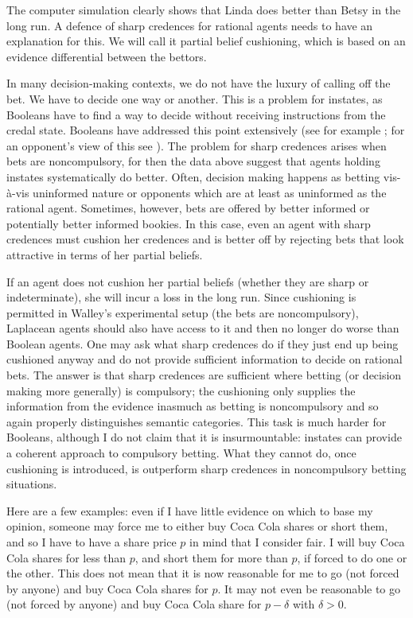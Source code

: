 \documentclass[11pt]{article}
\begin{document}
The computer simulation clearly shows that Linda does better than
Betsy in the long run. A defence of sharp credences for rational
agents needs to have an explanation for this. We will call it partial
belief cushioning, which is based on an evidence differential between
the bettors.

In many decision-making contexts, we do not have the luxury of calling
off the bet. We have to decide one way or another. This is a problem
for instates, as Booleans have to find a way to decide without
receiving instructions from the credal state. Booleans have addressed
this point extensively (see for example ; for
an opponent's view of this see ). The problem
for sharp credences arises when bets are noncompulsory, for then the
data above suggest that agents holding instates systematically do
better. Often, decision making happens as betting vis-{\`a}-vis
uninformed nature or opponents which are at least as uninformed as the
rational agent. Sometimes, however, bets are offered by better
informed or potentially better informed bookies. In this case, even an
agent with sharp credences must cushion her credences and is better
off by rejecting bets that look attractive in terms of her partial
beliefs.

If an agent does not cushion her partial beliefs (whether they are
sharp or indeterminate), she will incur a loss in the long run. Since
cushioning is permitted in Walley's experimental setup (the bets are
noncompulsory), Laplacean agents should also have access to it and
then no longer do worse than Boolean agents. One may ask what sharp
credences do if they just end up being cushioned anyway and do not
provide sufficient information to decide on rational bets. The answer
is that sharp credences are sufficient where betting (or decision
making more generally) is compulsory; the cushioning only supplies the
information from the evidence inasmuch as betting is noncompulsory and
so again properly distinguishes semantic categories. This task is much
harder for Booleans, although I do not claim that it is
insurmountable: instates can provide a coherent approach to compulsory
betting. What they cannot do, once cushioning is introduced, is
outperform sharp credences in noncompulsory betting situations.

Here are a few examples: even if I have little evidence on which to
base my opinion, someone may force me to either buy Coca Cola shares
or short them, and so I have to have a share price $p$ in mind that I
consider fair. I will buy Coca Cola shares for less than $p$, and
short them for more than $p$, if forced to do one or the other. This
does not mean that it is now reasonable for me to go (not forced by
anyone) and buy Coca Cola shares for $p$. It may not even be
reasonable to go (not forced by anyone) and buy Coca Cola share for
$p-\delta$ with $\delta{}>0$.
\end{document}
